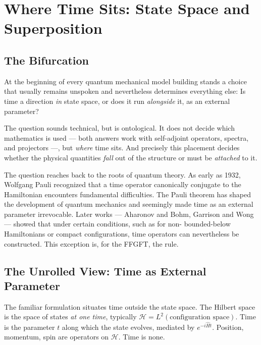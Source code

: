 \chapter{Where Time Sits: State Space and Superposition}
\label{ch:zeit}

\section{The Bifurcation}

At the beginning of every quantum mechanical model building stands a choice that
usually remains unspoken and nevertheless determines everything else: Is
time a direction \emph{in} state space, or does it run
\emph{alongside} it, as an external parameter?

The question sounds technical, but is ontological. It does not decide
which mathematics is used --- both answers work with
self-adjoint operators, spectra, and projectors ---, but \emph{where}
time sits. And precisely this placement decides whether the
physical quantities \emph{fall} out of the structure or must be
\emph{attached} to it.

The question reaches back to the roots of quantum theory. As early as 1932,
Wolfgang Pauli recognized that a time operator canonically conjugate to the
Hamiltonian encounters fundamental difficulties. The Pauli theorem has
shaped the development of quantum mechanics and seemingly made time as an external parameter
irrevocable. Later works --- Aharonov and Bohm, Garrison and Wong ---
showed that under certain conditions, such as for non-
bounded-below Hamiltonians or compact configurations,
time operators can nevertheless be constructed. This exception is, for the FFGFT,
the rule.

\section{The Unrolled View: Time as External Parameter}

The familiar formulation situates time outside the state space.
The Hilbert space is the space of states \emph{at one
time}, typically $\mathcal{H} = L^2(\text{configuration space})$.
Time is the parameter $t$ along which the state
evolves, mediated by $e^{-i\hat Ht}$. Position, momentum, spin are
operators on $\mathcal{H}$. Time is none.


